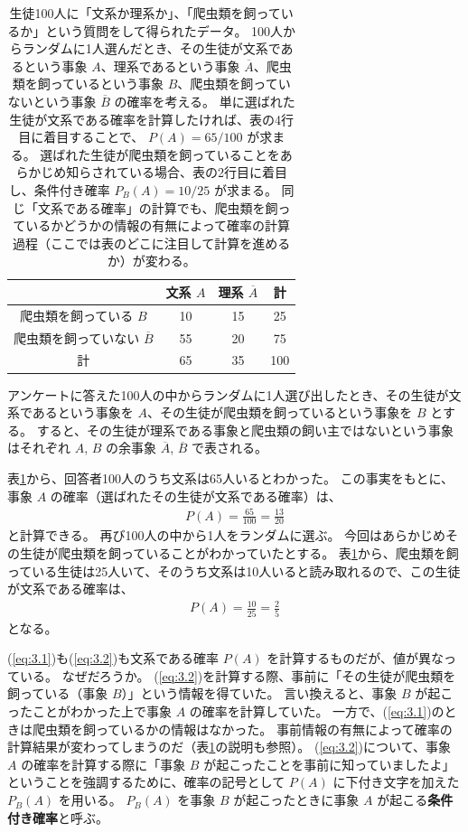 \documentclass[12pt]{ltjsarticle}\usepackage{ifthen}\newcounter{enlarge}\setcounter{enlarge}{1}
\begin{document}
\begin{table}[tb]
\captionsetup{width=.9\linewidth}
\caption{%
  生徒100人に「文系か理系か」、「爬虫類を飼っているか」という質問をして得られたデータ。
  100人からランダムに1人選んだとき、その生徒が文系であるという事象 $A$、理系であるという事象 $\overline{A}$、爬虫類を飼っているという事象 $B$、爬虫類を飼っていないという事象 $\overline{B}$ の確率を考える。
  単に選ばれた生徒が文系である確率を計算したければ、表の4行目に着目することで、 $P(A) = 65/100$ が求まる。
  選ばれた生徒が爬虫類を飼っていることをあらかじめ知らされている場合、表の2行目に着目し、条件付き確率 $P_B (A) = 10/25$ が求まる。
  同じ「文系である確率」の計算でも、爬虫類を飼っているかどうかの情報の有無によって確率の計算過程（ここでは表のどこに注目して計算を進めるか）が変わる。
}
\label{t:3.1}
\centering
\begin{tabular}{c|cc|c} \hline
 & 文系 $A$ & 理系 $\overline{A}$ & 計 \\ \hline
爬虫類を飼っている $B$ & 10 & 15 & 25 \\
爬虫類を飼っていない $\overline{B}$ & 55 & 20 & 75 \\ \hline
計 & 65 & 35 & 100 \\ \hline
\end{tabular}    
\end{table}

アンケートに答えた100人の中からランダムに1人選び出したとき、その生徒が文系であるという事象を $A$、その生徒が爬虫類を飼っているという事象を $B$ とする。
すると、その生徒が理系である事象と爬虫類の飼い主ではないという事象はそれぞれ $A$, $B$ の余事象 $\overline{A}$, $\overline{B}$ で表される。

表\ref{t:3.1}から、回答者100人のうち文系は65人いるとわかった。
この事実をもとに、事象 $A$ の確率（選ばれたその生徒が文系である確率）は、
\begin{align}
  P(A) = \frac{65}{100} = \frac{13}{20} \label{eq:3.1}
\end{align}
と計算できる。
再び100人の中から1人をランダムに選ぶ。
今回はあらかじめその生徒が爬虫類を飼っていることがわかっていたとする。
表\ref{t:3.1}から、爬虫類を飼っている生徒は25人いて、そのうち文系は10人いると読み取れるので、この生徒が文系である確率は、
\begin{align}
  P(A) = \frac{10}{25} = \frac{2}{5} \label{eq:3.2}
\end{align}
となる。

(\ref{eq:3.1})も(\ref{eq:3.2})も文系である確率 $P(A)$ を計算するものだが、値が異なっている。
なぜだろうか。
(\ref{eq:3.2})を計算する際、事前に「その生徒が爬虫類を飼っている（事象 $B$）」という情報を得ていた。
言い換えると、事象 $B$ が起こったことがわかった上で事象 $A$ の確率を計算していた。
一方で、(\ref{eq:3.1})のときは爬虫類を飼っているかの情報はなかった。
事前情報の有無によって確率の計算結果が変わってしまうのだ（表\ref{t:3.1}の説明も参照）。
(\ref{eq:3.2})について、事象 $A$ の確率を計算する際に「事象 $B$ が起こったことを事前に知っていましたよ」ということを強調するために、確率の記号として $P(A)$ に下付き文字を加えた $P_B (A)$ を用いる。
$P_B (A)$ を事象 $B$ が起こったときに事象 $A$ が起こる\textbf{条件付き確率}と呼ぶ。
\end{document}

